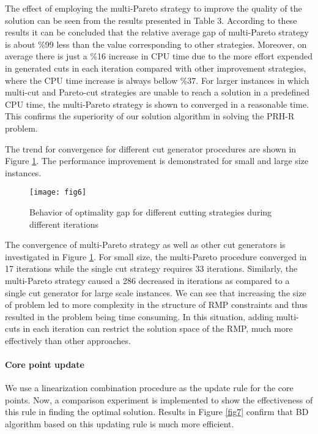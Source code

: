\documentclass[review]{elsarticle}
\begin{document}
The effect of employing the multi-Pareto strategy to improve the quality of the solution can be seen from the results presented in Table 3. According to these results it can be concluded that the relative average gap of multi-Pareto strategy is about \%99 less than the value corresponding to other strategies. Moreover, on average there is just a \%16 increase in CPU time due to the more effort expended in generated cuts in each iteration compared with other improvement strategies, where the CPU time increase is always bellow \%37. For larger instances in which multi-cut and Pareto-cut strategies are unable to reach a solution in a predefined CPU time, the multi-Pareto strategy is shown to converged in a reasonable time. This confirms the superiority of our solution algorithm in solving the PRH-R problem.

 The trend for convergence for different cut generator procedures are shown in Figure \ref{fig6}. The performance improvement is demonstrated for small and large size instances.

\begin{figure}[h!]
\centering
\texttt{[image: fig6]}
\caption{Behavior of optimality gap for different cutting strategies during different iterations}\label{fig6}
\end{figure}

The convergence of multi-Pareto strategy as well as other cut generators is investigated in Figure \ref{fig6}. For small size, the multi-Pareto procedure converged in 17 iterations while the single cut strategy requires 33 iterations. Similarly, the multi-Pareto strategy caused a 286 decreased in iterations as compared to a single cut generator for large scale instances. We can see that increasing the size of problem led to more complexity in the structure of RMP constraints and thus resulted in the problem being time consuming. In this situation, adding multi-cuts in each iteration can restrict the solution space of the RMP, much more effectively than other approaches.

\paragraph{Core point update }

We use a linearization combination procedure as the update rule for the core points. Now, a comparison experiment is implemented to show the effectiveness of this rule in finding the optimal solution. Results in Figure \ref{fig7} confirm that BD algorithm based on this updating rule is much more efficient.
\end{document}
